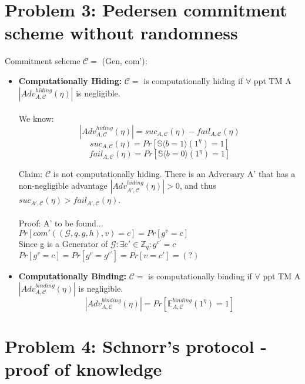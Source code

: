 \documentclass[12pt,pdftex,a4paper]{article}
\begin{document}
\section*{Problem 3: Pedersen commitment scheme without randomness}
Commitment scheme $\mathcal{C} =$ (Gen, com'):
\begin{itemize}
\item \textbf{Computationally Hiding:} 
$\mathcal{C} =$ is computationally hiding if $\forall$ ppt TM A $|Adv_{A,\mathcal{C}}^{hiding}(\eta)|$ is negligible.
\\~\\
We know: $$|Adv_{A,\mathcal{C}}^{hiding}(\eta)| = suc_{A,\mathcal{C}}(\eta) - fail_{A,\mathcal{C}}(\eta)$$
$$suc_{A,\mathcal{C}}(\eta) = Pr[\mathbb{S}\langle b=1\rangle (1^{\eta})=1]$$
$$fail_{A,\mathcal{C}}(\eta) = Pr[\mathbb{S}\langle b=0\rangle (1^{\eta})=1]$$

Claim: $\mathcal{C}$ is not computationally hiding. There is an Adversary A' that has a non-negligible advantage $|Adv_{A',\mathcal{C}}^{hiding}(\eta)|>0$, and thus $suc_{A',\mathcal{C}}(\eta) > fail_{A',\mathcal{C}}(\eta)$.
\\~\\
Proof: A' to be found...
\\

$Pr[com'((\mathcal{G},q,g,h), v) = c] = Pr[g^v=c]$
\\
Since g is a Generator of $\mathcal{G}:\exists c'\in \mathbb{Z}_q:g^{c'}=c$
\\
$Pr[g^v=c] = Pr[g^v = g^{c'}] = Pr[v = c'] = (?)$

\item \textbf{Computationally Binding:}
$\mathcal{C} =$ is computationally binding if $\forall$ ppt TM A $|Adv_{A,\mathcal{C}}^{binding}(\eta)|$ is negligible.
$$|Adv_{A,\mathcal{C}}^{binding}(\eta)| = Pr[\mathbb{E}_{A,\mathcal{C}}^{binding}(1^{\eta})=1]$$
\end{itemize}

\section*{Problem 4: Schnorr’s protocol - proof of knowledge}
\end{document}
